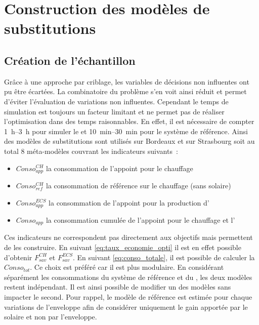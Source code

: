 \section{Construction des modèles de substitutions} %
\label{sec:construction_des_modeles_de_substitutions}
\subsection{Création de l’échantillon} %
\label{sub:creation_de_l_echantillon}
Grâce à une approche par criblage, les variables de décisions non influentes ont pu être
écartées. La combinatoire du problème s’en voit ainsi réduit et permet d’éviter
l’évaluation de variations non influentes.
Cependant le temps de simulation est toujours un facteur limitant et ne permet pas
de réaliser l’optimisation dans des temps raisonnables. En effet, il est nécessaire de
compter \SIrange{1}{3}{h} pour simuler le  et \SIrange{10}{30}{min} pour
le système de référence.
Ainsi des modèles de substitutions sont utilisés sur Bordeaux et sur Strasbourg
soit au total $8$ méta-modèles couvrant les indicateurs suivants~:
\begin{itemize}
  \item $Conso_{app}^{CH}$ la consommation de l’appoint pour le chauffage
  \item $Conso_{ref}^{CH}$ la consommation de référence sur le chauffage (sans solaire)
  \item $Conso_{app}^{ECS}$ la consommation de l’appoint pour la production d’
  \item $Conso_{app}$ la consommation cumulée de l’appoint pour le chauffage et l’
\end{itemize}

Ces indicateurs ne correspondent pas directement aux objectifs mais permettent de les construire.
En suivant \eqref{eq:taux_economie_opti} il est en effet possible d’obtenir $F_{sav}^{CH}$ et $F_{sav}^{ECS}$.
En suivant \eqref{eq:conso_totale}, il est possible de calculer la $Conso_{tot}$.
Ce choix est préféré car il est plus modulaire. En considérant séparément les consommations
du système de référence et du , les deux modèles restent indépendant. Il est
ainsi possible de modifier un des modèles sans impacter le second. Pour rappel, le
modèle de référence est estimée pour chaque variations de l’enveloppe afin de considérer
uniquement le gain apportée par le solaire et non par l’enveloppe.

